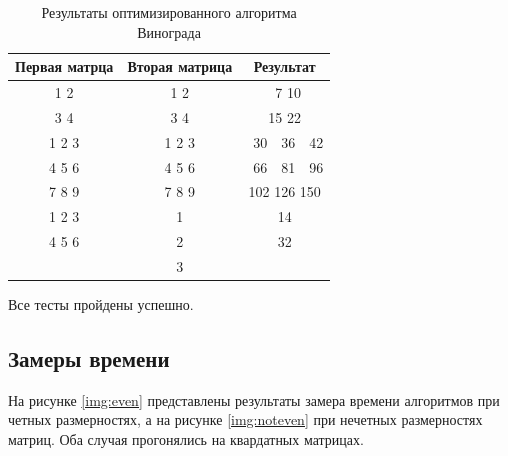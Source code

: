 \documentclass[a4paper,12pt]{article}
\begin{document}
\begin{table}[H]
    \caption{Результаты оптимизированного алгоритма Винограда}
    \label{table:test-modvin}
    \centering
    \begin{tabular}{|c|c|c|}
        \hline
        Первая матрца & Вторая матрица & Результат \\
        \hline
        1 2 & 1 2 & \ 7 10 \\
        3 4 & 3 4 & 15 22 \\
        \hline
        1 2 3 & 1 2 3 & \ 30\ \ 36\ \ 42 \\
        4 5 6 & 4 5 6 & \ 66\ \ 81\ \ 96 \\
        7 8 9 & 7 8 9 & 102 126 150 \\
        \hline
        1 2 3 & 1 & 14 \\
        4 5 6 & 2 & 32 \\
              & 3 & \\
        \hline
    \end{tabular}
\end{table}

Все тесты пройдены успешно.

\subsection{Замеры времени}

На рисунке \ref{img:even} представлены результаты замера времени алгоритмов при
четных размерностях, а на рисунке \ref{img:noteven} при нечетных размерностях матриц.
Оба случая прогонялись на квардатных матрицах.
\end{document}

